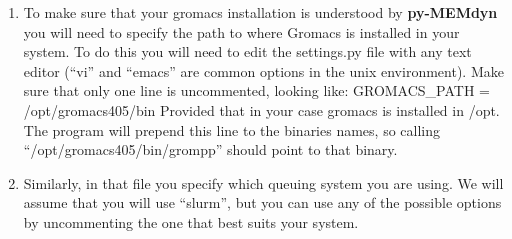 \documentclass[10pt, oneside, pdftex]{article}
\begin{document}
\begin{enumerate}
\item{To make  sure that  your gromacs  installation is  understood by
  \textbf{py-MEMdyn}  you  will need  to  specify  the path  to  where
  Gromacs is  installed in your  system. To do  this you will  need to
  edit the settings.py file with any text editor (``vi'' and ``emacs''
  are common options in the unix environment). Make sure that only one
  line    is    uncommented,    looking    like:    GROMACS\_PATH    =
  /opt/gromacs405/bin Provided that in  your case gromacs is installed
  in /opt. The  program will prepend this line to  the binaries names,
  so  calling  ``/opt/gromacs405/bin/grompp''  should  point  to  that
  binary.}

\item{Similarly, in that file you specify which queuing system you are
  using.  We will assume that you  will use ``slurm'', but you can use
  any of the possible options by  uncommenting the one that best suits
  your system.}
\end{enumerate}
\end{document}
